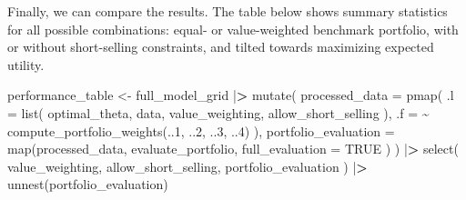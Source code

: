 \documentclass[
]{book}
\newenvironment{Shaded}{\begin{snugshade}}{\end{snugshade}}
\newcommand{\AttributeTok}[1]{\textcolor[rgb]{0.61,0.61,0.61}{#1}}
\newcommand{\ConstantTok}[1]{\textcolor[rgb]{0,0,0}{#1}}
\newcommand{\DecValTok}[1]{\textcolor[rgb]{0.06,0.06,0.06}{#1}}
\newcommand{\ErrorTok}[1]{\textcolor[rgb]{0.14,0.14,0.14}{\textbf{#1}}}
\newcommand{\FunctionTok}[1]{\textcolor[rgb]{0,0,0}{#1}}
\newcommand{\NormalTok}[1]{#1}
\newcommand{\OtherTok}[1]{\textcolor[rgb]{0.37,0.37,0.37}{#1}}
\newcommand{\SpecialCharTok}[1]{\textcolor[rgb]{0,0,0}{#1}}
\begin{document}
Finally, we can compare the results. The table below shows summary statistics for all possible combinations: equal- or value-weighted benchmark portfolio, with or without short-selling constraints, and tilted towards maximizing expected utility.

\begin{Shaded}
\begin{Highlighting}[]
\NormalTok{performance\_table }\OtherTok{\textless{}{-}}\NormalTok{ full\_model\_grid }\SpecialCharTok{|}\ErrorTok{\textgreater{}}
  \FunctionTok{mutate}\NormalTok{(}
    \AttributeTok{processed\_data =} \FunctionTok{pmap}\NormalTok{(}
      \AttributeTok{.l =} \FunctionTok{list}\NormalTok{(}
\NormalTok{        optimal\_theta,}
\NormalTok{        data,}
\NormalTok{        value\_weighting,}
\NormalTok{        allow\_short\_selling}
\NormalTok{      ),}
      \AttributeTok{.f =} \SpecialCharTok{\textasciitilde{}} \FunctionTok{compute\_portfolio\_weights}\NormalTok{(..}\DecValTok{1}\NormalTok{, ..}\DecValTok{2}\NormalTok{, ..}\DecValTok{3}\NormalTok{, ..}\DecValTok{4}\NormalTok{)}
\NormalTok{    ),}
    \AttributeTok{portfolio\_evaluation =} \FunctionTok{map}\NormalTok{(processed\_data,}
\NormalTok{      evaluate\_portfolio,}
      \AttributeTok{full\_evaluation =} \ConstantTok{TRUE}
\NormalTok{    )}
\NormalTok{  ) }\SpecialCharTok{|}\ErrorTok{\textgreater{}}
  \FunctionTok{select}\NormalTok{(}
\NormalTok{    value\_weighting,}
\NormalTok{    allow\_short\_selling,}
\NormalTok{    portfolio\_evaluation}
\NormalTok{  ) }\SpecialCharTok{|}\ErrorTok{\textgreater{}}
  \FunctionTok{unnest}\NormalTok{(portfolio\_evaluation)}


\end{Highlighting}
\end{Shaded}
\end{document}
